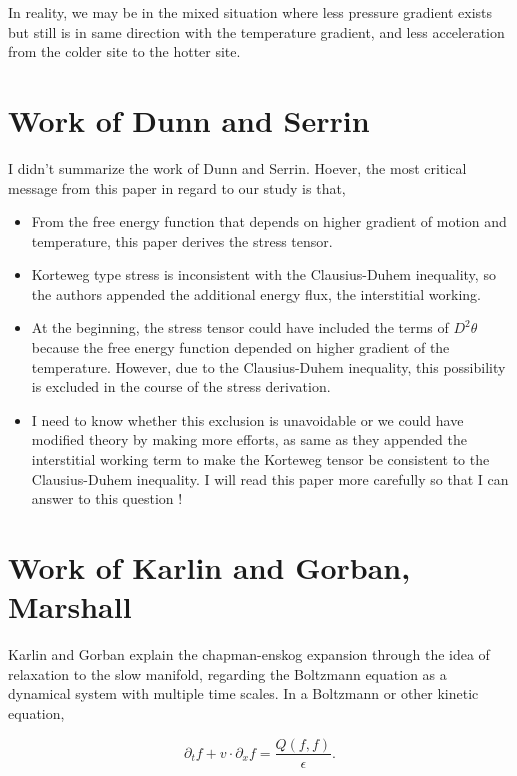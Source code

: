 \documentclass[a4paper,12pt]{article}
\begin{document}
\begin{enumerate}
In reality, we may be in the mixed situation where less pressure gradient exists but still is in same direction with the temperature gradient, and less acceleration from the colder site to the hotter site.
\end{enumerate}

\section{Work of Dunn and Serrin}
I didn't summarize the work of Dunn and Serrin. Hoever, the most critical message from this paper in regard to our study is that,
\begin{itemize}
 \item From the free energy function that depends on higher gradient of motion and temperature, this paper derives the stress tensor.
 \item Korteweg type stress is inconsistent with the Clausius-Duhem inequality, so the authors appended the additional energy flux, the interstitial working.
 \item At the beginning, the stress tensor could have included the terms of $D^2\theta$ because the free energy function depended on higher gradient of the temperature. However, due to the Clausius-Duhem inequality, this possibility is excluded in the course of the stress derivation.
 \item I need to know whether this exclusion is unavoidable or we could have modified theory by making more efforts, as same as they appended the interstitial working term to make the Korteweg tensor be consistent to the Clausius-Duhem inequality. I will read this paper more carefully so that I can answer to this question !
\end{itemize}

\section{Work of Karlin and Gorban, Marshall}
Karlin and Gorban explain the chapman-enskog expansion through the idea of relaxation to the slow manifold, regarding the Boltzmann equation as a dynamical system with multiple time scales. In a Boltzmann or other kinetic equation,

{{{$$ \partial_t f + v \cdot \partial_x f = \frac{Q(f,f)}{\epsilon}. $$}}}
\end{document}
